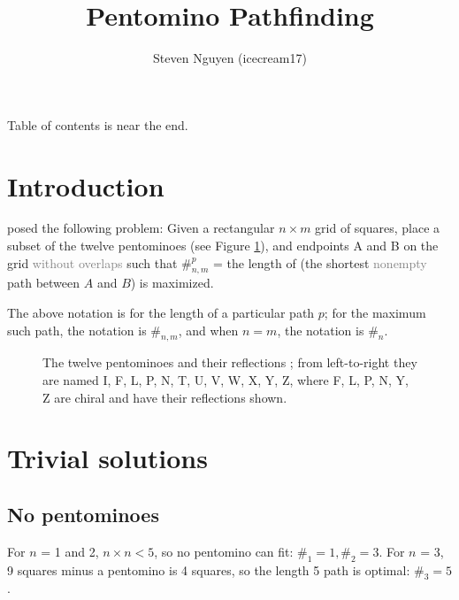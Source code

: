 \documentclass{article}
\title{Pentomino Pathfinding}
\author{Steven Nguyen (icecream17)}
\begin{document}
\maketitle

Table of contents is near the end.

\section{Introduction}

\cite{v1} posed the following problem: Given a rectangular $n \times m$ grid of squares, place a subset of the twelve pentominoes (see Figure \ref{fig:pentominoes}), and endpoints A and B on the grid \textcolor{gray}{without overlaps} such that $\#^{p}_{n, m}$ = the length of (the shortest \textcolor{gray}{nonempty} path between $A$ and $B$) is maximized.

The above notation is for the length of a particular path $p$; for the maximum such path, the notation is $\#_{n, m}$, and when $n = m$, the notation is $\#_n$.

\begin{figure}[!h]
    \centering
    
    \caption{The twelve pentominoes and their reflections \cite{pentominoes};
    from left-to-right they are named I, F, L, P, N, T, U, V, W, X, Y, Z,
    where F, L, P, N, Y, Z are chiral and have their reflections shown.}
    \label{fig:pentominoes}
\end{figure}

\section{Trivial solutions}

\subsection{No pentominoes}

For $n$ = 1 and 2, $n \times n < 5$, so no pentomino can fit: $\#_1 = 1, \#_2 = 3$.
For $n$ = 3, 9 squares minus a pentomino is 4 squares, so the length 5 path is optimal: $\#_3 = 5$.

\end{document}
